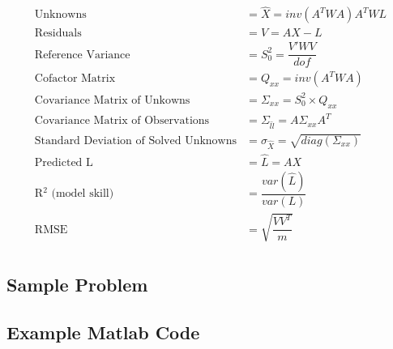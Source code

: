 \begin{align*}
	\text{Unknowns} &= \hat{X} = inv(A^TWA)A^TWL\\
	\text{Residuals} &= V = AX - L\\
	\text{Reference Variance} &= S_0^2 = \dfrac{V'WV}{dof} \\
	\text{Cofactor Matrix} &= Q_{xx} = inv(A^TWA) \\
	\text{Covariance Matrix of Unkowns} &= \Sigma_{xx} = S_0^2 \times Q_{xx} \\
	\text{Covariance Matrix of Observations} &= \Sigma_{\hat{l}\hat{l}} = A \Sigma_{xx} A^T \\
	\text{Standard Deviation of Solved Unknowns} &= \sigma_{\hat{X}} = \sqrt{diag(\Sigma_{xx})} \\
	\text{Predicted L} &= \hat{L} = AX \\
	\text{R$^2$ (model skill)} &= \dfrac{var(\hat{L})}{var(L)} \\
	\text{RMSE } &= \sqrt{\dfrac{VV^T}{m}} \\
\end{align*}
\clearpage
\subsection{Sample Problem}
\subsection{Example Matlab Code}
